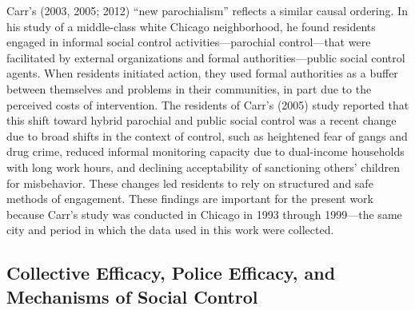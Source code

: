 \documentclass [11pt, proquest] {uwthesis}[2015/03/03]
\begin{document}
Carr's (2003, 2005; 2012) ``new parochialism'' reflects a similar causal ordering. In his study of a middle-class white Chicago neighborhood, he found residents engaged in informal social control activities---parochial control---that were facilitated by external organizations and formal authorities---public social control agents. When residents initiated action, they used formal authorities as a buffer between themselves and problems in their communities, in part due to the perceived costs of intervention. The residents of Carr's (2005) study reported that this shift toward hybrid parochial and public social control was a recent change due to broad shifts in the context of control, such as heightened fear of gangs and drug crime, reduced informal monitoring capacity due to dual-income households with long work hours, and declining acceptability of sanctioning others' children for misbehavior. These changes led residents to rely on structured and safe methods of engagement. These findings are important for the present work because Carr's study was conducted in Chicago in 1993 through 1999---the same city and period in which the data used in this work were collected.

\hypertarget{collective-efficacy-police-efficacy-and-mechanisms-of-social-control}{%
\subsection{Collective Efficacy, Police Efficacy, and Mechanisms of Social Control}\label{collective-efficacy-police-efficacy-and-mechanisms-of-social-control}}
\end{document}
